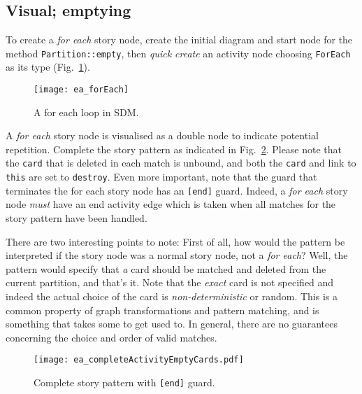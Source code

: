 \newpage
\subsection{Visual; emptying}
\visHeader
\hypertarget{emptyPartition vis}{}

To create a \emph{for each} story node, create the initial diagram and start node for the method \texttt{Partition::empty}, then \emph{quick create} an 
activity node choosing \texttt{ForEach} as its type (Fig.~\ref{fig:sdm_foreach}).

\begin{figure}[htbp]
\begin{center}
  \texttt{[image: ea\_forEach]}
  \caption{A for each loop in SDM.}  
  \label{fig:sdm_foreach}
\end{center}
\end{figure}

A \emph{for each} story node is visualised as a double node to indicate potential repetition.  Complete the story pattern as indicated in
Fig.~\ref{fig:sdm_end}.   Please note that the \texttt{card} that is deleted in each match is unbound, and both the \texttt{card} and link to \texttt{this} are
set to \texttt{destroy}. Even more important, note that the guard that terminates the for each story node has an \texttt{[end]} guard. Indeed, a \emph{for%
each} story node \emph{must} have an end activity edge which is taken when all matches for the story pattern have been handled.

There are two interesting points to note: First of all, how would the pattern be interpreted if the story node was a normal story node, not a \emph{for each}?
Well, the pattern would specify that \emph{a} card should be matched and deleted from the current partition, and that's it. Note that the \emph{exact} card is
not specified and indeed the actual choice of the card is \emph{non-deterministic} or random.  This is a common property of graph transformations and pattern
matching, and is something that takes some to get used to.  In general, there are no guarantees concerning the choice and order of valid matches.

\begin{figure}[htbp]
\begin{center}
  \texttt{[image: ea\_completeActivityEmptyCards.pdf]}
  \caption{Complete story pattern with \texttt{[end]} guard.}  
  \label{fig:sdm_end}
\end{center}
\end{figure}

